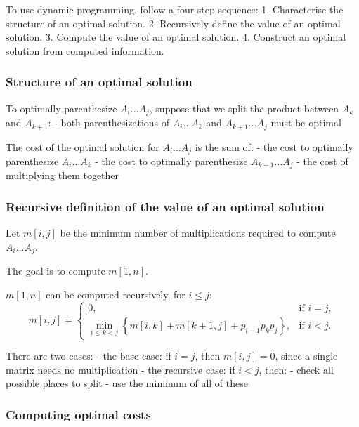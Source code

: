 \documentclass[11pt]{article}
\begin{document}
To use dynamic programming, follow a four-step sequence: 1. Characterise
the structure of an optimal solution. 2. Recursively define the value of
an optimal solution. 3. Compute the value of an optimal solution. 4.
Construct an optimal solution from computed information.

    \subsubsection{Structure of an optimal
solution}\label{structure-of-an-optimal-solution}

To optimally parenthesize \(A_i \ldots A_j\), suppose that we split the
product between \(A_k\) and \(A_{k+1}\): - both parenthesizations of
\(A_i \ldots A_k\) and \(A_{k+1} \ldots A_j\) must be optimal

The cost of the optimal solution for \(A_i \ldots A_j\) is the sum of: -
the cost to optimally parenthesize \(A_i \ldots A_k\) - the cost to
optimally parenthesize \(A_{k+1} \ldots A_j\) - the cost of multiplying
them together

    \subsubsection{Recursive definition of the value of an optimal
solution}\label{recursive-definition-of-the-value-of-an-optimal-solution}

Let \(m[i, j]\) be the minimum number of multiplications required to
compute \(A_i \ldots A_j\).

The goal is to compute \(m[1, n]\).

\(m[1, n]\) can be computed recursively, for \(i \leq j\): \[
m[i,j] =
\begin{cases}
0, & \text{if } i = j, \\[2mm]
\displaystyle \min_{i \le k < j}
\left\{ m[i,k] + m[k+1,j] + p_{i-1} p_k p_j \right\},
& \text{if } i < j .
\end{cases}
\]

There are two cases: - the base case: if \(i = j\), then \(m[i,j] = 0\),
since a single matrix needs no multiplication - the recursive case: if
\(i < j\), then: - check all possible places to split - use the minimum
of all of these

    \subsubsection{Computing optimal costs}\label{computing-optimal-costs}
\end{document}
